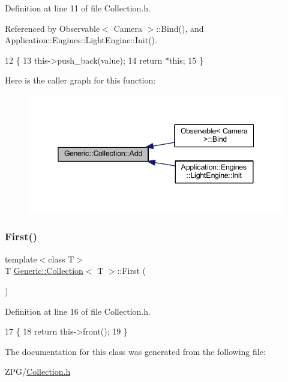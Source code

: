 Definition at line 11 of file Collection.\+h.



Referenced by Observable$<$ Camera $>$\+::\+Bind(), and Application\+::\+Engines\+::\+Light\+Engine\+::\+Init().


\begin{DoxyCode}
12         \{
13             this->push\_back(value);
14             \textcolor{keywordflow}{return} *\textcolor{keyword}{this};
15         \}
\end{DoxyCode}
Here is the caller graph for this function\+:
\nopagebreak
\begin{figure}[H]
\begin{center}
\leavevmode
\includegraphics[width=345pt]{classGeneric_1_1Collection_a602c700fa46602ce551b5c133793924c_icgraph}
\end{center}
\end{figure}
\mbox{\label{classGeneric_1_1Collection_abc2e126c8aaaabf8e4ff8da2d35011c3}} 
\subsubsection{\texorpdfstring{First()}{First()}}
{\footnotesize\ttfamily template$<$class T$>$ \\
T \mbox{\hyperlink{classGeneric_1_1Collection}{Generic\+::\+Collection}}$<$ T $>$\+::First (\begin{DoxyParamCaption}{ }\end{DoxyParamCaption})\hspace{0.3cm}{\ttfamily [inline]}}



Definition at line 16 of file Collection.\+h.


\begin{DoxyCode}
17         \{
18             \textcolor{keywordflow}{return} this->front();
19         \}
\end{DoxyCode}


The documentation for this class was generated from the following file\+:\begin{DoxyCompactItemize}
\item 
Z\+P\+G/\mbox{\hyperlink{Collection_8h}{Collection.\+h}}\end{DoxyCompactItemize}

